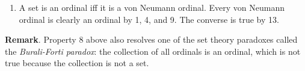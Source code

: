 \documentclass[12pt]{article}
\begin{document}
\begin{enumerate}
\begin{proof}  Suppose an ordinal $\alpha\ne \varnothing$.  Being a transitive set of ordinals (by 3), $\beta:=\bigcup \alpha$ is also an ordinal by 9. So $\beta\subseteq \alpha$.  Then either $\beta=\alpha$ or $\beta\subset \alpha$.  In the former case, $\alpha=\bigcup \alpha$.  In the latter case, $\beta\in \alpha$.  On the one hand, since $\beta = \sup \alpha$, any $\gamma \in \alpha$, either $\gamma=\beta$ or $\gamma \in \beta$, so that $\gamma\in \beta^+$ in any case.  This means that $\alpha\subseteq \beta^+$.  On the other hand, $\beta\in \alpha$ combined with $\beta \subset \alpha$ give us the other inclusion $\beta^+\subseteq \alpha$.  As a result, $\alpha=\beta^+$.
\end{proof}
\item A set is an ordinal iff it is a von Neumann ordinal.  Every von Neumann ordinal is clearly an ordinal by 1, 4, and 9.  The converse is true by 13.
\end{enumerate}

\textbf{Remark}.  Property 8 above also resolves one of the set theory paradoxes called the \emph{Burali-Forti paradox}: the collection of all ordinals is an ordinal, which is not true because the collection is not a set.
\end{document}
